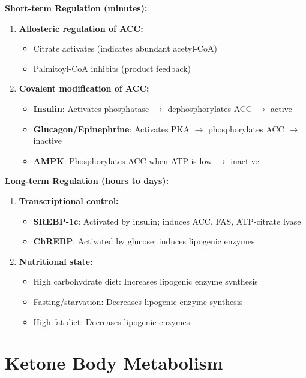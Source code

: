 \textbf{Short-term Regulation (minutes):}

\begin{enumerate}
    \item \textbf{Allosteric regulation of ACC:}
    \begin{itemize}
        \item Citrate activates (indicates abundant acetyl-CoA)
        \item Palmitoyl-CoA inhibits (product feedback)
    \end{itemize}
    
    \item \textbf{Covalent modification of ACC:}
    \begin{itemize}
        \item \textbf{Insulin}: Activates phosphatase $\rightarrow$ dephosphorylates ACC $\rightarrow$ active
        \item \textbf{Glucagon/Epinephrine}: Activates PKA $\rightarrow$ phosphorylates ACC $\rightarrow$ inactive
        \item \textbf{AMPK}: Phosphorylates ACC when ATP is low $\rightarrow$ inactive
    \end{itemize}
\end{enumerate}

\textbf{Long-term Regulation (hours to days):}

\begin{enumerate}
    \item \textbf{Transcriptional control:}
    \begin{itemize}
        \item \textbf{SREBP-1c}: Activated by insulin; induces ACC, FAS, ATP-citrate lyase
        \item \textbf{ChREBP}: Activated by glucose; induces lipogenic enzymes
    \end{itemize}
    
    \item \textbf{Nutritional state:}
    \begin{itemize}
        \item High carbohydrate diet: Increases lipogenic enzyme synthesis
        \item Fasting/starvation: Decreases lipogenic enzyme synthesis
        \item High fat diet: Decreases lipogenic enzymes
    \end{itemize}
\end{enumerate}

\section{Ketone Body Metabolism}

